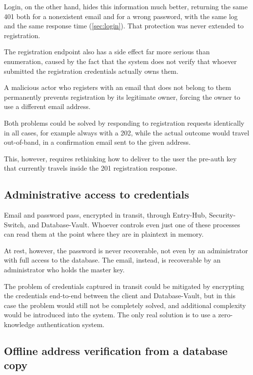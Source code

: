 Login, on the other hand, hides this information much better, returning the same 401 both for a nonexistent
email and for a wrong password, with the same log and the same response time
(\autoref{sec:login}). That protection was never extended to registration.

The registration endpoint also has a side effect far more serious than enumeration, caused
by the fact that the system does not verify that whoever submitted the registration credentials actually
owns them.

A malicious actor who registers with an email that does not belong to them permanently prevents registration
by its legitimate owner, forcing the owner to use a different email address.

Both problems could be solved by responding to registration requests identically in
all cases, for example always with a 202, while the actual outcome would travel out-of-band, in a
confirmation email sent to the given address.

This, however, requires rethinking how to deliver to the user the pre-auth key that currently travels inside the
201 registration response.

\subsection{Administrative access to credentials}
\label{sec:accesso-credenziali}

Email and password pass, encrypted in transit, through Entry-Hub, Security-Switch, and Database-Vault.
Whoever controls even just one of these processes can read them at the point where they are in plaintext in memory.

At rest, however, the password is never recoverable, not even by an administrator with full
access to the database. The email, instead, is recoverable by an administrator who holds the master key.

The problem of credentials captured in transit could be mitigated by encrypting the credentials end-to-end
between the client and Database-Vault, but in this case the problem would still not be completely
solved, and additional complexity would be introduced into the system. The only real solution is to use a zero-knowledge
authentication system.

\subsection{Offline address verification from a database copy}

